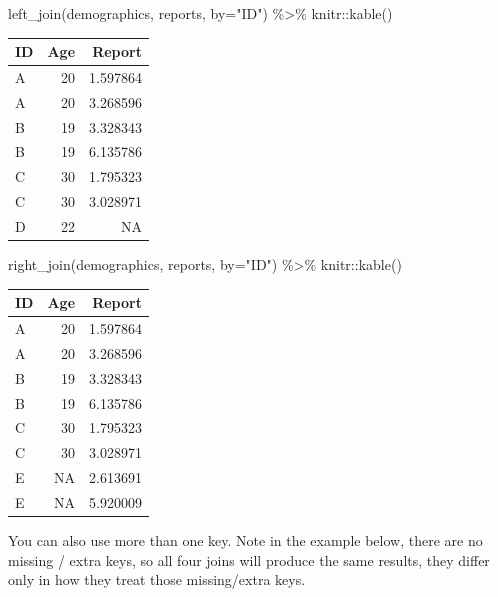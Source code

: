 \documentclass[
]{book}
\newenvironment{Shaded}{\begin{snugshade}}{\end{snugshade}}
\newcommand{\AttributeTok}[1]{\textcolor[rgb]{0.77,0.63,0.00}{#1}}
\newcommand{\FunctionTok}[1]{\textcolor[rgb]{0.00,0.00,0.00}{#1}}
\newcommand{\NormalTok}[1]{#1}
\newcommand{\SpecialCharTok}[1]{\textcolor[rgb]{0.00,0.00,0.00}{#1}}
\newcommand{\StringTok}[1]{\textcolor[rgb]{0.31,0.60,0.02}{#1}}
\begin{document}
\begin{Shaded}
\begin{Highlighting}[]
\FunctionTok{left\_join}\NormalTok{(demographics, reports, }\AttributeTok{by=}\StringTok{"ID"}\NormalTok{) }\SpecialCharTok{\%\textgreater{}\%}
\NormalTok{  knitr}\SpecialCharTok{::}\FunctionTok{kable}\NormalTok{()}
\end{Highlighting}
\end{Shaded}

\begin{tabular}{l|r|r}
\hline
ID & Age & Report\\
\hline
A & 20 & 1.597864\\
\hline
A & 20 & 3.268596\\
\hline
B & 19 & 3.328343\\
\hline
B & 19 & 6.135786\\
\hline
C & 30 & 1.795323\\
\hline
C & 30 & 3.028971\\
\hline
D & 22 & NA\\
\hline
\end{tabular}

\begin{Shaded}
\begin{Highlighting}[]
\FunctionTok{right\_join}\NormalTok{(demographics, reports, }\AttributeTok{by=}\StringTok{"ID"}\NormalTok{) }\SpecialCharTok{\%\textgreater{}\%}
\NormalTok{  knitr}\SpecialCharTok{::}\FunctionTok{kable}\NormalTok{()}
\end{Highlighting}
\end{Shaded}

\begin{tabular}{l|r|r}
\hline
ID & Age & Report\\
\hline
A & 20 & 1.597864\\
\hline
A & 20 & 3.268596\\
\hline
B & 19 & 3.328343\\
\hline
B & 19 & 6.135786\\
\hline
C & 30 & 1.795323\\
\hline
C & 30 & 3.028971\\
\hline
E & NA & 2.613691\\
\hline
E & NA & 5.920009\\
\hline
\end{tabular}

You can also use more than one key. Note in the example below, there are no missing / extra keys, so all four joins will produce the same results, they differ only in how they treat those missing/extra keys.
\end{document}
